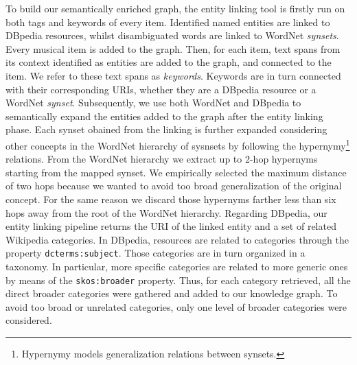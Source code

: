 To build our semantically enriched graph, the entity linking tool is firstly run on both tags and keywords of every item. Identified named entities are linked to DBpedia resources, whilst disambiguated words are linked to WordNet \textit{synsets}. Every musical item is added to the graph. Then, for each item, text spans from its context identified as entities are added to the graph, and connected to the item. We refer to these text spans as \textit{keywords}. Keywords are in turn connected with their corresponding URIs, whether they are a DBpedia resource or a WordNet \textit{synset}.
Subsequently, we use both WordNet and DBpedia to semantically expand the entities added to the graph after the entity linking phase. 
Each synset obained from the linking is further expanded considering other concepts in the WordNet hierarchy of sysnsets by following the hypernymy\footnote{Hypernymy models generalization relations between synsets.} relations. 
From the WordNet hierarchy we extract up to 2-hop hypernyms starting from the mapped synset. We empirically selected the maximum distance of two hops because we wanted to avoid too broad generalization of the original concept. For the same reason we discard those hypernyms farther less than six hops away from the root of the WordNet hierarchy. %
Regarding DBpedia, our entity linking pipeline returns the URI of the linked entity and a set of related Wikipedia categories. In DBpedia, resources are related to categories through the property \texttt{dcterms:subject}. Those categories are in turn organized in a taxonomy. In particular, more specific categories are related to more generic ones by means of the \texttt{skos:broader} property. Thus, for each category retrieved, all the direct broader categories were gathered and added to our knowledge graph. To avoid too broad or unrelated categories, only one level of broader categories were considered.

